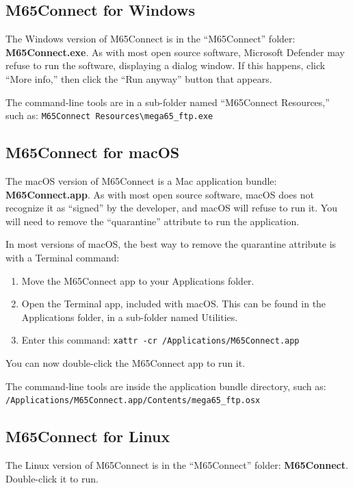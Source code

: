 \subsection{M65Connect for Windows}

The Windows version of M65Connect is in the ``M65Connect'' folder: {\bf M65Connect.exe}. As with most open source software, Microsoft Defender may refuse to run the software, displaying a dialog window. If this happens, click ``More info,'' then click the ``Run anyway'' button that appears.

The command-line tools are in a sub-folder named ``M65Connect Resources,'' such as: {\tt M65Connect Resources\textbackslash{}mega65\_ftp.exe}

\subsection{M65Connect for macOS}

The macOS version of M65Connect is a Mac application bundle: {\bf M65Connect.app}. As with most open source software, macOS does not recognize it as ``signed'' by the developer, and macOS will refuse to run it. You will need to remove the ``quarantine'' attribute to run the application.

In most versions of macOS, the best way to remove the quarantine attribute is with a Terminal command:

\begin{enumerate}
\item Move the M65Connect app to your Applications folder.
\item Open the Terminal app, included with macOS. This can be found in the Applications folder, in a sub-folder named Utilities.
\item Enter this command: {\tt xattr -cr /Applications/M65Connect.app}
\end{enumerate}

You can now double-click the M65Connect app to run it.

The command-line tools are inside the application bundle directory, such as: {\tt /Applications/M65Connect.app/Contents/mega65\_ftp.osx}

\subsection{M65Connect for Linux}

The Linux version of M65Connect is in the ``M65Connect'' folder: {\bf M65Connect}. Double-click it to run.

